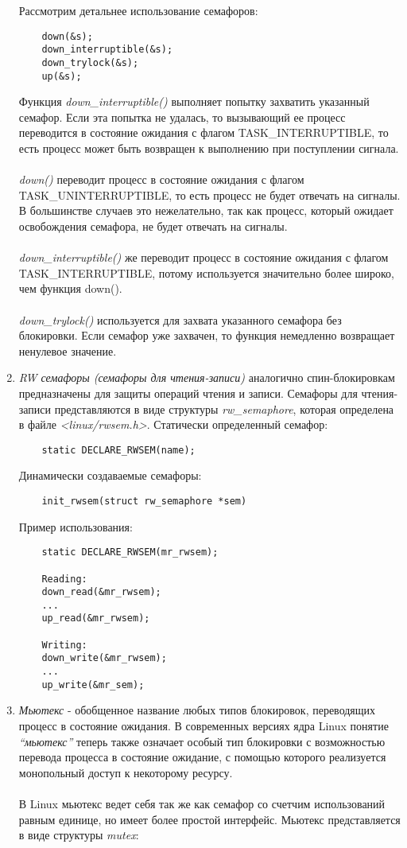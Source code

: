 \begin{enumerate}
    Рассмотрим детальнее использование семафоров:
    \begin{lstlisting}
    down(&s);
    down_interruptible(&s);
    down_trylock(&s);
    up(&s);
    \end{lstlisting}
    Функция \textit{down\_interruptible()} выполняет попытку захватить указанный семафор. Если эта попытка не удалась, то вызывающий ее процесс переводится в состояние ожидания с флагом TASK\_INTERRUPTIBLE, то есть процесс может быть возвращен к выполнению при поступлении сигнала.
    \\\\
    \textit{down()} переводит процесс в состояние ожидания с флагом TASK\_UNINTERRUPTIBLE, то есть процесс не будет отвечать на сигналы. В большинстве случаев это нежелательно, так как процесс, который ожидает освобождения семафора, не будет отвечать на сигналы.
    \\\\
    \textit{down\_interruptible()} же переводит процесс в состояние ожидания с флагом TASK\_INTERRUPTIBLE, потому используется значительно более широко, чем функция down().
    \\\\
    \textit{down\_trylock()} используется для захвата указанного семафора без блокировки. Если семафор уже захвачен, то функция немедленно возвращает ненулевое значение.
    \item \textit{RW семафоры (семафоры для чтения-записи)} аналогично спин-блокировкам предназначены для защиты операций чтения и записи.
    Семафоры для чтения-записи представляются в виде структуры \textit{rw_semaphore}, которая определена в файле \textit{<linux/rwsem.h>}. Статически определенный семафор:
    \begin{lstlisting}
    static DECLARE_RWSEM(name);
    \end{lstlisting}
    Динамически создаваемые семафоры:
    \begin{lstlisting}
    init_rwsem(struct rw_semaphore *sem)
    \end{lstlisting}
    Пример использования:
    \begin{lstlisting}
    static DECLARE_RWSEM(mr_rwsem);
    
    Reading:
    down_read(&mr_rwsem);
    ...
    up_read(&mr_rwsem);
    
    Writing:
    down_write(&mr_rwsem);
    ...
    up_write(&mr_sem);
    \end{lstlisting}
    \item \textit{Мьютекс} - обобщенное название любых типов блокировок, переводящих процесс в состояние ожидания. В современных версиях ядра Linux понятие \textit{“мьютекс”} теперь также означает особый тип блокировки с возможностью перевода процесса в состояние ожидание, с помощью которого реализуется монопольный доступ к некоторому ресурсу. 
    \\\\
    В Linux мьютекс ведет себя так же как семафор со счетчим использований равным единице, но имеет более простой интерфейс. Мьютекс представляется в виде структуры \textit{mutex}:
    

\end{enumerate}
